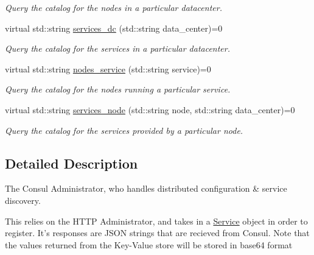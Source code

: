 \begin{DoxyCompactItemize}
\begin{DoxyCompactList}\small\item\em Query the catalog for the nodes in a particular datacenter. \end{DoxyCompactList}\item 
\hypertarget{classConsulInterface_ab1c3f2169a8aebdb5a66cfe8211330dc}{virtual std\-::string \hyperlink{classConsulInterface_ab1c3f2169a8aebdb5a66cfe8211330dc}{services\-\_\-dc} (std\-::string data\-\_\-center)=0}\label{classConsulInterface_ab1c3f2169a8aebdb5a66cfe8211330dc}

\begin{DoxyCompactList}\small\item\em Query the catalog for the services in a particular datacenter. \end{DoxyCompactList}\item 
\hypertarget{classConsulInterface_a7490a960b2e10855c7d7ff09d87942b8}{virtual std\-::string \hyperlink{classConsulInterface_a7490a960b2e10855c7d7ff09d87942b8}{nodes\-\_\-service} (std\-::string service)=0}\label{classConsulInterface_a7490a960b2e10855c7d7ff09d87942b8}

\begin{DoxyCompactList}\small\item\em Query the catalog for the nodes running a particular service. \end{DoxyCompactList}\item 
\hypertarget{classConsulInterface_abbd5b2839d3548d48e93074a53844f40}{virtual std\-::string \hyperlink{classConsulInterface_abbd5b2839d3548d48e93074a53844f40}{services\-\_\-node} (std\-::string node, std\-::string data\-\_\-center)=0}\label{classConsulInterface_abbd5b2839d3548d48e93074a53844f40}

\begin{DoxyCompactList}\small\item\em Query the catalog for the services provided by a particular node. \end{DoxyCompactList}\end{DoxyCompactItemize}


\subsection{Detailed Description}
The Consul Administrator, who handles distributed configuration \& service discovery. 

This relies on the H\-T\-T\-P Administrator, and takes in a \hyperlink{classService}{Service} object in order to register. It's responses are J\-S\-O\-N strings that are recieved from Consul. Note that the values returned from the Key-\/\-Value store will be stored in base64 format 


